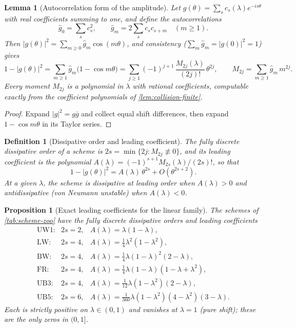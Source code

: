 \documentclass[pdflatex,sn-mathphys-num]{sn-jnl}%
\theoremstyle{thmstyleone}%
\newtheorem{lemma}{Lemma}%
\newtheorem{proposition}{Proposition}%
\theoremstyle{thmstyletwo}%
\theoremstyle{thmstylethree}%
\newtheorem{definition}{Definition}%
\begin{document}
\begin{lemma}[Autocorrelation form of the amplitude]\label{lem:amplitude}
Let $g(\theta)=\sum_s c_s(\lambda)e^{-is\theta}$ with real coefficients summing to one, and define the autocorrelations \[ \hat g_0=\sum_s c_s^2, \qquad \hat g_m=2\sum_s c_sc_{s+m}\quad(m\ge1). \]
Then $|g(\theta)|^2=\sum_{m\ge0}\hat g_m\cos(m\theta)$, and consistency ($\sum_m\hat g_m=|g(0)|^2=1$) gives \[ 1-|g(\theta)|^2 = \sum_{m\ge1}\hat g_m\bigl(1-\cos m\theta\bigr) = \sum_{j\ge1}(-1)^{j+1}\,\frac{M_{2j}(\lambda)}{(2j)!}\,\theta^{2j}, \qquad M_{2j}=\sum_{m\ge1}\hat g_m\,m^{2j} . \]
Every moment $M_{2j}$ is a polynomial in $\lambda$ with rational coefficients, computable exactly from the coefficient polynomials of \cref{lem:collision-finite}.
\end{lemma}

\begin{proof}
Expand $|g|^2=g\bar g$ and collect equal shift differences, then expand $1-\cos m\theta$ in its Taylor series.
\end{proof}

\begin{definition}[Dissipative order and leading coefficient]\label{def:diss-order}
The \emph{fully discrete dissipative order} of a scheme is $2s=\min\{2j:M_{2j}\not\equiv0\}$, and its \emph{leading coefficient} is the polynomial $A(\lambda)=(-1)^{s+1}M_{2s}(\lambda)/(2s)!$, so that \[ 1-|g(\theta)|^2=A(\lambda)\,\theta^{2s}+O(\theta^{2s+2}) . \]
At a given $\lambda$, the scheme is dissipative at leading order when $A(\lambda)>0$ and \emph{antidissipative} (von Neumann unstable) when $A(\lambda)<0$.
\end{definition}

\begin{proposition}[Exact leading coefficients for the linear family]\label{prop:dissipation}
The schemes of \cref{tab:scheme-zoo} have the fully discrete dissipative orders and leading coefficients \[
\begin{array}{llll}
\text{UW1:} & 2s=2, & A(\lambda)=\lambda(1-\lambda),                                       \\[2pt]
\text{LW:}  & 2s=4, & A(\lambda)=\tfrac14\lambda^2(1-\lambda^2),                           \\[2pt]
\text{BW:}  & 2s=4, & A(\lambda)=\tfrac14\lambda(1-\lambda)^2(2-\lambda),                  \\[2pt]
\text{FR:}  & 2s=4, & A(\lambda)=\tfrac14\lambda(1-\lambda)(1-\lambda+\lambda^2),          \\[2pt]
\text{UB3:} & 2s=4, & A(\lambda)=\tfrac1{12}\lambda(1-\lambda^2)(2-\lambda),               \\[2pt]
\text{UB5:} & 2s=6, & A(\lambda)=\tfrac1{360}\lambda(1-\lambda^2)(4-\lambda^2)(3-\lambda).
\end{array}
\]
Each is strictly positive on $\lambda\in(0,1)$ and vanishes at $\lambda=1$ (pure shift); these are the only zeros in $(0,1]$.
\end{proposition}
\end{document}
